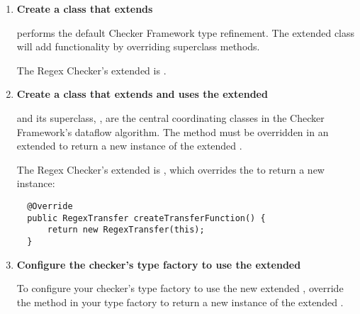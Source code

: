 \begin{enumerate}
\item \textbf{Create a class that extends
    }

   performs the default Checker
  Framework type refinement.  The extended class will add functionality by
  overriding superclass methods.

  The Regex Checker's extended  is
  .

\item \textbf{Create a class that extends
     and uses the extended
    }

  \begin{sloppypar}
   and its superclass,
  , are the central coordinating classes
  in the Checker Framework's dataflow algorithm. The
   method must be overridden in an extended
   to return a new instance of the
  extended .
  \end{sloppypar}

  \begin{sloppypar}
  The Regex Checker's extended  is
  , which overrides the
   to return a new
   instance:
  \end{sloppypar}

\begin{smaller}
\begin{Verbatim}
  @Override
  public RegexTransfer createTransferFunction() {
      return new RegexTransfer(this);
  }
\end{Verbatim}
\end{smaller}

\item \textbf{Configure the checker's type factory to use the extended
    }

\begin{sloppypar}
To configure your checker's type factory to use the new extended
, override the
 method in your type factory to return a new instance
of the extended .
\end{sloppypar}


\end{enumerate}
